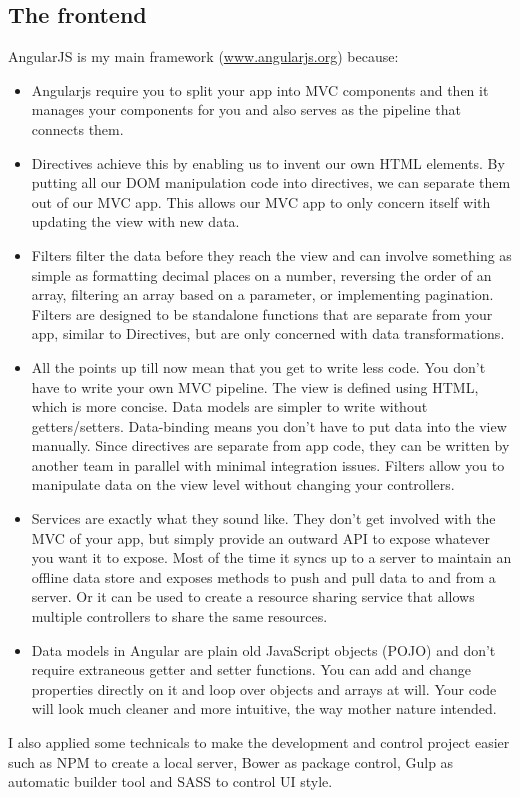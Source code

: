 \documentclass[a4paper,12pt]{article}
\begin{document}
\subsection{The frontend}
AngularJS is my main framework (\url{www.angularjs.org}) because:
\begin{itemize}
	\item Angularjs require you to split your app into MVC components and then it manages your components for you and also serves as the pipeline that connects them.
	\item Directives achieve this by enabling us to invent our own HTML elements. By putting all our DOM manipulation code into directives, we can separate them out of our MVC app. This allows our MVC app to only concern itself with updating the view with new data.
	\item Filters filter the data before they reach the view and can involve something as simple as formatting decimal places on a number, reversing the order of an array, filtering an array based on a parameter, or implementing pagination. Filters are designed to be standalone functions that are separate from your app, similar to Directives, but are only concerned with data transformations.
	\item All the points up till now mean that you get to write less code. You don’t have to write your own MVC pipeline. The view is defined using HTML, which is more concise. Data models are simpler to write without getters/setters. Data-binding means you don’t have to put data into the view manually. Since directives are separate from app code, they can be written by another team in parallel with minimal integration issues. Filters allow you to manipulate data on the view level without changing your controllers.
	\item Services are exactly what they sound like. They don’t get involved with the MVC of your app, but simply provide an outward API to expose whatever you want it to expose. Most of the time it syncs up to a server to maintain an offline data store and exposes methods to push and pull data to and from a server. Or it can be used to create a resource sharing service that allows multiple controllers to share the same resources.
	\item Data models in Angular are plain old JavaScript objects (POJO) and don’t require extraneous getter and setter functions. You can add and change properties directly on it and loop over objects and arrays at will. Your code will look much cleaner and more intuitive, the way mother nature intended.
\end{itemize}
I also applied some technicals to make the development and
control project easier such as NPM to create a local server, Bower as package control, Gulp as automatic builder tool and SASS to control UI style.
\end{document}
